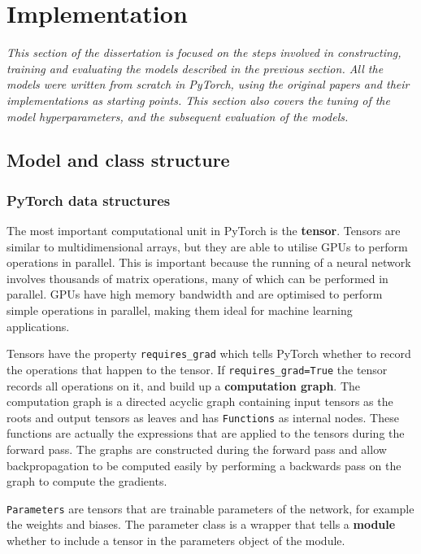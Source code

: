 \chapter{Implementation}

\textit{This section of the dissertation is focused on the steps involved in constructing, training and evaluating the models 
described in the previous section.
All the models were written from scratch in PyTorch, using the original papers and their implementations as starting points.
This section also covers the tuning of the model hyperparameters, and the subsequent evaluation of the models.}

\section{Model and class structure}

\subsection{PyTorch data structures}
The most important computational unit in PyTorch is the \textbf{tensor}. Tensors are similar to multidimensional arrays, but they are able to 
utilise GPUs to perform operations in parallel. This is important because the running of a neural network involves thousands of matrix 
operations, many of which can be performed in parallel. GPUs have high memory bandwidth and are 
optimised to perform simple operations in parallel, making them ideal for machine learning applications.

Tensors have the property \texttt{requires\_grad} which tells PyTorch whether to record the operations that happen to the tensor. If 
\texttt{requires\_grad=True} the tensor records all operations on it, and build up a \textbf{computation graph}. The computation graph is a 
directed acyclic graph containing input tensors as the roots and output
tensors as leaves and has \texttt{Functions} as internal nodes. These functions are actually the expressions that are applied to the 
tensors during the forward pass. The graphs are constructed during the forward pass and allow backpropagation to be computed easily by performing a 
backwards pass on the graph to compute the gradients.

\texttt{Parameters} are tensors that are trainable parameters of the network, for example the weights and biases. The parameter class is a 
wrapper that tells a \textbf{module} whether to include a tensor in the parameters object of the module.


